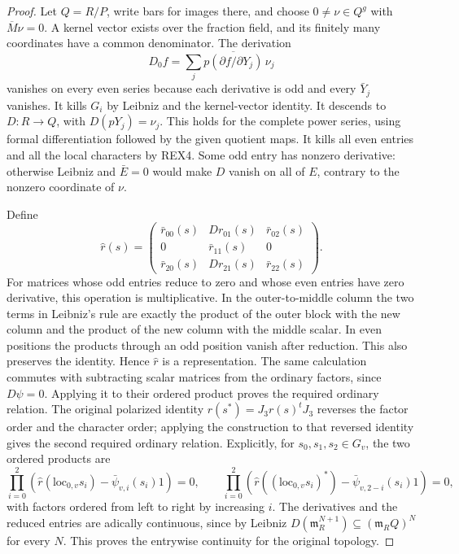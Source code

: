\begin{proof}
Let \(Q=R/P\), write bars for images there, and choose
\(0\ne\nu\in Q^g\) with \(\overline M\nu=0\). A kernel vector
exists over the fraction field, and its finitely many coordinates
have a common denominator. The derivation
\[
 D_0 f=\sum_j\overline{p(\partial f/\partial Y_j)}\,\nu_j
\]
vanishes on every even series because each derivative is odd and
every \(\bar Y_j\) vanishes. It kills \(G_i\) by Leibniz and the
kernel-vector identity. It descends to \(D:R\to Q\), with
\(D(pY_j)=\nu_j\). This holds for the complete power series, using
formal differentiation followed by the given quotient maps.
It kills all even entries and all the local characters by REX4.
Some odd entry has nonzero derivative: otherwise Leibniz and
\(\bar E=0\) would make \(D\) vanish on all of \(E\), contrary to
the nonzero coordinate of \(\nu\).

Define
\[
 \widehat r(s)=
 \begin{pmatrix}
 \bar r_{00}(s)&D r_{01}(s)&\bar r_{02}(s)\\
 0&\bar r_{11}(s)&0\\
 \bar r_{20}(s)&D r_{21}(s)&\bar r_{22}(s)
 \end{pmatrix}.
\]
For matrices whose odd entries reduce to zero and whose even entries
have zero derivative, this operation is multiplicative. In the
outer-to-middle column the two terms in Leibniz's rule are exactly
the product of the outer block with the new column and the product
of the new column with the middle scalar. In even positions the
products through an odd position vanish after reduction. This also
preserves the identity. Hence \(\widehat r\) is a representation.
The same calculation commutes with subtracting scalar matrices from
the ordinary factors, since \(D\psi=0\). Applying it to their ordered
product proves the required ordinary relation. The original polarized
identity \(r(s^*)=J_3 r(s)^t J_3\) reverses the factor order and
the character order; applying the construction to that reversed
identity gives the second required ordinary relation. Explicitly, for
\(s_0,s_1,s_2\in G_v\), the two ordered products are
\[
 \prod_{i=0}^{2}
 (\widehat r(\mathrm{loc}_{0,v}s_i)-\bar\psi_{v,i}(s_i)1)=0,
 \qquad
 \prod_{i=0}^{2}
 (\widehat r((\mathrm{loc}_{0,v}s_i)^*)-\bar\psi_{v,2-i}(s_i)1)=0,
\]
with factors ordered from left to right by increasing \(i\). The derivatives
and the reduced entries are adically continuous, since by Leibniz
\(D(\mathfrak m_R^{N+1})\subseteq(\mathfrak m_R Q)^N\) for every
\(N\). This proves the entrywise continuity for the original topology.


\end{proof}
